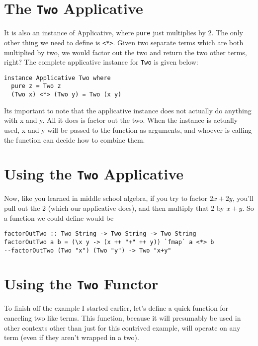 \documentclass[12pt]{article}
\begin{document}
  \section{The \texttt{Two} Applicative}

  It is also an instance of Applicative, where \texttt{pure} just multiplies by 2. The only other thing we need to define is \texttt{<*>}. Given two separate terms which are both multiplied by two, we would factor out the two and return the two other terms, right? The complete applicative instance for \texttt{Two} is given below:

  \begin{verbatim}
instance Applicative Two where
  pure z = Two z
  (Two x) <*> (Two y) = Two (x y)
  \end{verbatim}

  Its important to note that the applicative instance does not actually do anything with x and y. All it does is factor out the two. When the instance is actually used, x and y will be passed to the function as arguments, and whoever is calling the function can decide how to combine them.

  \section{Using the \texttt{Two} Applicative}

  Now, like you learned in middle school algebra, if you try to factor \(2x + 2y\), you'll pull out the 2 (which our applicative does), and then multiply that 2 by \(x+y\). So a function we could define would be 

  \begin{verbatim}
factorOutTwo :: Two String -> Two String -> Two String 
factorOutTwo a b = (\x y -> (x ++ "+" ++ y)) `fmap` a <*> b
--factorOutTwo (Two "x") (Two "y") -> Two "x+y"
  \end{verbatim}

  \section{Using the \texttt{Two} Functor}

  To finish off the example I started earlier, let's define a quick function for canceling two like terms. This function, because it will presumably be used in other contexts other than just for this contrived example, will operate on any term (even if they aren't wrapped in a two). 
\end{document}
